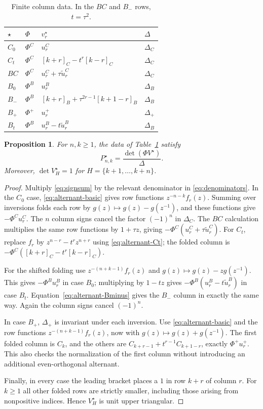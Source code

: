 \documentclass[12pt]{article}
\newtheorem{proposition}[theorem]{Proposition}
\numberwithin{equation}{section}
\begin{document}
\begin{table}[htbp]
\centering
\renewcommand{\arraystretch}{1.35}
\begin{tabular}{@{}llll@{}}
\toprule
$\star$ & $\Phi$ & $v_r^\star$ & $\Delta$\\
\midrule
$C_0$ & $\Phi^C$ & $u_r^C$ & $\Delta_C$\\
$C_t$ & $\Phi^C$ & $[k+r]_C-t^r[k-r]_C$ & $\Delta_C$\\
$BC$ & $\Phi^C$ & $u_r^C+\tau\widetilde u_r^C$ & $\Delta_C$\\
$B_0$ & $\Phi^B$ & $u_r^B$ & $\Delta_B$\\
$B_-$ & $\Phi^B$ & $[k+r]_B+\tau^{2r-1}[k+1-r]_B$ & $\Delta_B$\\
$B_+$ & $\Phi^+$ & $u_r^+$ & $\Delta_+$\\
$B_t$ & $\Phi^B$ & $u_r^B-t\widetilde u_r^B$ & $\Delta_B$\\
\bottomrule
\end{tabular}
\caption{Finite column data.  In the $BC$ and $B_-$ rows, $t=\tau^2$.}
\label{tab:finite-columns}
\end{table}

\begin{proposition}\label{prop:finite}
For $n,k\ge1$, the data of Table~\ref{tab:finite-columns} satisfy
\[
 P^\star_{n,k}=\frac{\det(\Phi V^\star)}{\Delta}.
\]
Moreover, $\det V^\star_H=1$ for $H=\{k+1,\ldots,k+n\}$.
\end{proposition}

\begin{proof}
Multiply \eqref{eq:signsum} by the relevant denominator in
\eqref{eq:denominators}.  In the $C_0$ case,
\eqref{eq:alternant-basic} gives row functions
$z^{-n-k}f_r(z)$.  Summing over inversions folds each row by
$g(z)\mapsto g(z)-g(z^{-1})$, and these functions give
$-\Phi^C u_r^C$.  The $n$ column signs cancel the factor $(-1)^n$
in $\Delta_C$.  The $BC$ calculation multiplies the same row
functions by $1+\tau z$, giving
$-\Phi^C(u_r^C+\tau\widetilde u_r^C)$.
For $C_t$, replace $f_r$ by $z^{n-r}-t^rz^{n+r}$ using
\eqref{eq:alternant-Ct}; the folded column is
$-\Phi^C([k+r]_C-t^r[k-r]_C)$.

For the shifted folding use $z^{-(n+k-1)}f_r(z)$ and
$g(z)\mapsto g(z)-zg(z^{-1})$.  This gives
$-\Phi^B u_r^B$ in case $B_0$; multiplying by $1-tz$ gives
$-\Phi^B(u_r^B-t\widetilde u_r^B)$ in case $B_t$.
Equation~\eqref{eq:alternant-Bminus} gives the $B_-$ column in
exactly the same way.  Again the column signs cancel $(-1)^n$.

In case $B_+$, $\Delta_+$ is invariant under each inversion.
Use \eqref{eq:alternant-basic} and the row functions
$z^{-(n+k-1)}f_r(z)$, now with
$g(z)\mapsto g(z)+g(z^{-1})$.  The first folded column is $C_k$,
and the others are
$C_{k+r-1}+t^{r-1}C_{k+1-r}$, exactly $\Phi^+u_r^+$.
This also checks the normalization of the first column without
introducing an additional even-orthogonal alternant.

Finally, in every case the leading bracket places a $1$ in row $k+r$
of column $r$.  For $k\ge1$ all other folded rows are strictly
smaller, including those arising from nonpositive indices.  Hence
$V^\star_H$ is unit upper triangular.
\end{proof}
\end{document}
